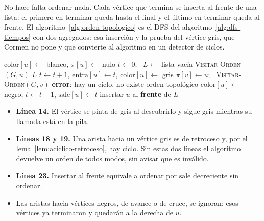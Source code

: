 \documentclass[11pt,letterpaper]{article}
\begin{document}
No hace falta ordenar nada. Cada vértice que termina se inserta al
frente de una lista: el primero en terminar queda hasta el final y el
último en terminar queda al frente. El
algoritmo~\ref{alg:orden-topologico} es el DFS del
algoritmo~\ref{alg:dfs-tiempos} con dos agregados: esa inserción y la
prueba del vértice gris, que Cormen no pone y que convierte al
algoritmo en un detector de ciclos.

\begin{algorithm}[H]
\caption{\textsc{Orden-Topológico}$(G)$, con DFS y detección de
         ciclos}
\label{alg:orden-topologico}
\begin{algorithmic}[1]
    \State $\text{color}[u] \gets$ blanco, \quad $\pi[u] \gets$ nulo
  \EndFor
  \State $t \gets 0$; \ $L \gets$ lista vacía
      \State \textsc{Visitar-Orden}$(G, u)$
    \EndIf
  \EndFor
  \State \Return $L$
\EndProcedure
\Statex
{}
  \State $t \gets t + 1$, \quad $\text{entra}[u] \gets t$, \quad
         $\text{color}[u] \gets$ gris
      \State $\pi[v] \gets u$; \ \textsc{Visitar-Orden}$(G, v)$
     
      \State \textbf{error}: hay un ciclo, no existe orden topológico
    \EndIf
  \EndFor
  \State $\text{color}[u] \gets$ negro, \quad $t \gets t + 1$, \quad
         $\text{sale}[u] \gets t$
  \State insertar $u$ al \textbf{frente} de $L$
\EndProcedure
\end{algorithmic}
\end{algorithm}

\begin{itemize}[itemsep=0.1em]
  \item \textbf{Línea 14.} El vértice se pinta de gris al descubrirlo
        y sigue gris mientras su llamada está en la pila.
  \item \textbf{Líneas 18 y 19.} Una arista hacia un vértice gris es
        de retroceso y, por el lema~\ref{lem:aciclico-retroceso}, hay
        ciclo. Sin estas dos líneas el algoritmo devuelve un orden de
        todos modos, sin avisar que es inválido.
  \item \textbf{Línea 23.} Insertar al frente equivale a ordenar por
        $\text{sale}$ decreciente sin ordenar.
  \item Las aristas hacia vértices negros, de avance o de cruce, se
        ignoran: esos vértices ya terminaron y quedarán a la derecha de
        $u$.
\end{itemize}
\end{document}

